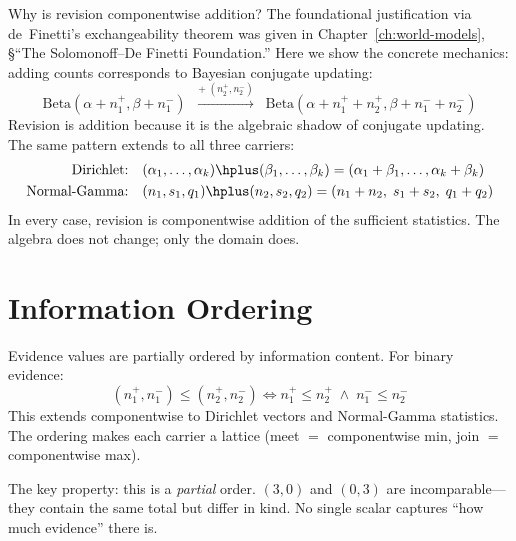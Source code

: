 \documentclass[11pt,openany]{report}
\begin{document}
Why is revision componentwise addition?  The foundational justification
via de~Finetti's exchangeability theorem was given in
Chapter~\ref{ch:world-models}, \S``The Solomonoff--De Finetti
Foundation.''  Here we show the concrete mechanics: adding counts
corresponds to Bayesian conjugate updating:
\[
  \text{Beta}(\alpha + n_1^+, \beta + n_1^-)
  \;\;\xrightarrow{+\;(n_2^+, n_2^-)}\;\;
  \text{Beta}(\alpha + n_1^+ + n_2^+, \beta + n_1^- + n_2^-)
\]
Revision is addition because it is the algebraic shadow of conjugate
updating.  The same pattern extends to all three carriers:
\begin{align*}
  \text{Dirichlet:}\quad
  &(\alpha_1, \ldots, \alpha_k) \hplus (\beta_1, \ldots, \beta_k)
  = (\alpha_1 + \beta_1, \ldots, \alpha_k + \beta_k) \\
  \text{Normal-Gamma:}\quad
  &(n_1, s_1, q_1) \hplus (n_2, s_2, q_2)
  = (n_1 + n_2,\; s_1 + s_2,\; q_1 + q_2)
\end{align*}
In every case, revision is componentwise addition of the sufficient
statistics.  The algebra does not change; only the domain does.


\section{Information Ordering}

Evidence values are partially ordered by information content.  For
binary evidence:
\[
  (n_1^+, n_1^-) \le (n_2^+, n_2^-) \iff
  n_1^+ \le n_2^+ \;\wedge\; n_1^- \le n_2^-
\]
This extends componentwise to Dirichlet vectors and Normal-Gamma
statistics.  The ordering makes each carrier a lattice (meet $=$
componentwise min, join $=$ componentwise max).

The key property: this is a \emph{partial} order.  $(3, 0)$ and
$(0, 3)$ are incomparable---they contain the same total but differ in
kind.  No single scalar captures ``how much evidence'' there is.
\end{document}
